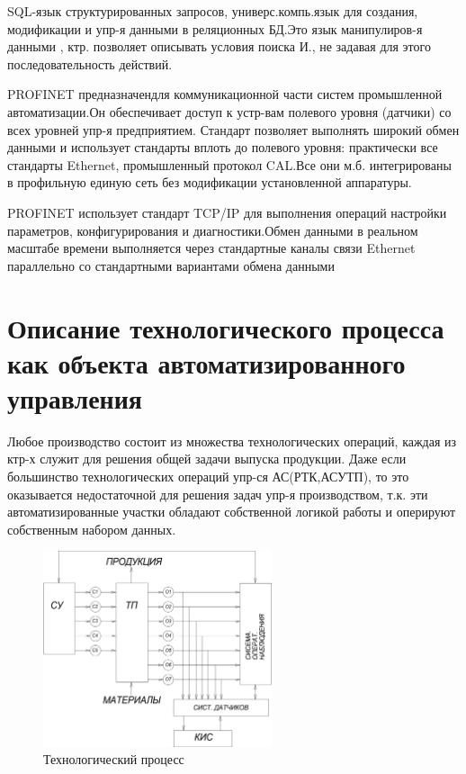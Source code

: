 \documentclass[unicode, 12pt, a4paper, oneside]{article}
\begin{document}
SQL-язык структурированных запросов, универс.компь.язык для создания, модификации и упр-я данными в реляционных БД.Это язык манипулиров-я данными , ктр. позволяет описывать условия поиска И., не задавая для этого последовательность действий.

PROFINET предназначендля коммуникационной части систем промышленной автоматизации.Он обеспечивает доступ к устр-вам полевого уровня (датчики) со всех уровней упр-я предприятием. Стандарт позволяет выполнять широкий обмен данными и использует стандарты вплоть до полевого уровня: практически все стандарты Ethernet, промышленный протокол CAL.Все они м.б. интегрированы в профильную единую сеть без модификации установленной аппаратуры.

PROFINET использует стандарт TCP/IP для выполнения операций настройки параметров, конфигурирования и диагностики.Обмен данными в реальном масштабе времени выполняется через стандартные каналы связи Ethernet параллельно со стандартными вариантами обмена данными

\section{Описание технологического процесса как объекта автоматизированного управления }

Любое производство состоит из множества технологических операций, каждая из ктр-х служит для решения общей задачи выпуска продукции. Даже если большинство технологических операций упр-ся АС(РТК,АСУТП), то это оказывается недостаточной для решения задач упр-я производством, т.к. эти автоматизированные участки обладают собственной логикой работы и оперируют собственным набором данных.

\begin{figure}[H]
\centering
\includegraphics[width=0.6\textwidth]{48.jpg}
\caption{Технологический процесс}
\end{figure}
\end{document}
